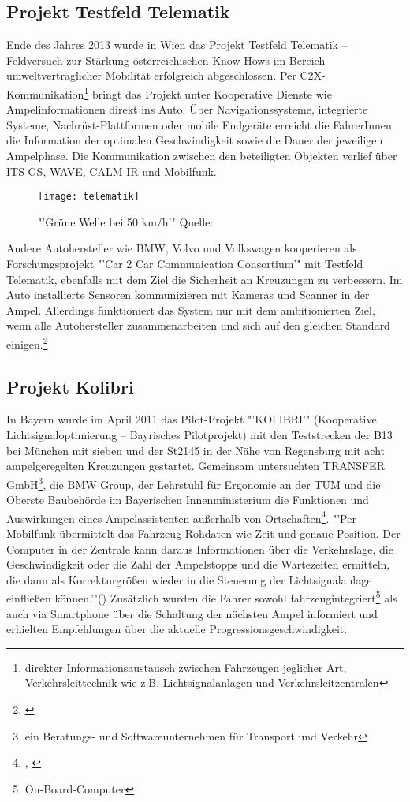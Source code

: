\subsection{Projekt Testfeld Telematik}
Ende des Jahres 2013 wurde in Wien das Projekt Testfeld Telematik -- Feldversuch zur Stärkung österreichischen Know-Hows im Bereich umweltverträglicher Mobilität erfolgreich abgeschlossen. Per \gls{C2X}-Kommunikation\footnote{direkter Informationsaustausch zwischen Fahrzeugen jeglicher Art, Verkehrsleittechnik wie z.B. Lichtsignalanlagen und Verkehrsleitzentralen} bringt das Projekt unter Kooperative Dienste wie Ampelinformationen direkt ins Auto. Über Navigationssysteme, integrierte Systeme, Nachrüst-Plattformen oder mobile Endgeräte erreicht die FahrerInnen die Information der optimalen Geschwindigkeit sowie die Dauer der jeweiligen Ampelphase. Die Kommunikation zwischen den beteiligten Objekten verlief über ITS-GS, WAVE, CALM-IR und Mobilfunk.
\begin{figure}[H]
    \centering
    \texttt{[image: telematik]}
    \label{fig:telematik}
    \caption[Telematik Ampelinformation]{"'Grüne Welle bei 50 km/h'" Quelle: \cite{telematik}}
\end{figure}
Andere Autohersteller wie \gls{BMW}, Volvo und Volkswagen kooperieren als Forschungsprojekt "'Car 2 Car Communication Consortium'" mit Testfeld Telematik, ebenfalls mit dem Ziel die Sicherheit an Kreuzungen zu verbessern. Im Auto installierte Sensoren kommunizieren mit Kameras und Scanner in der Ampel. Allerdings funktioniert das System nur mit dem ambitionierten Ziel, wenn alle Autohersteller zusammenarbeiten und sich auf den gleichen Standard einigen.\footnote{\cite{Siemens}}
\subsection{Projekt Kolibri}
In Bayern wurde im April 2011 das Pilot-Projekt "'KOLIBRI'" (Kooperative Lichtsignaloptimierung -- Bayrisches Pilotprojekt) mit den Teststrecken der B13 bei München mit sieben und der St2145 in der Nähe von Regensburg mit acht ampelgeregelten Kreuzungen gestartet. Gemeinsam untersuchten TRANSFER GmbH\footnote{ein Beratungs- und Softwareunternehmen für Transport und Verkehr}, die \gls{BMW} Group, der Lehrstuhl für Ergonomie an der \gls{TUM} und die Oberste Baubehörde im Bayerischen Innenministerium die Funktionen und Auswirkungen eines Ampelassistenten außerhalb von Ortschaften\footnote{\cite{kolibri}, \cite{kolibriTUM}}. "'Per Mobilfunk übermittelt das Fahrzeug Rohdaten wie Zeit und genaue Position. Der Computer in der Zentrale kann daraus Informationen über die Verkehrslage, die Geschwindigkeit oder die Zahl der Ampelstopps und die Wartezeiten ermitteln, die dann als Korrekturgrößen wieder in die Steuerung der Lichtsignalanlage einfließen können.'"(\cite{kolibriTUM}) Zusätzlich wurden die Fahrer sowohl fahrzeugintegriert\footnote{On-Board-Computer} als auch via Smartphone über die Schaltung der nächsten Ampel informiert und erhielten Empfehlungen über die aktuelle Progressionsgeschwindigkeit. 
